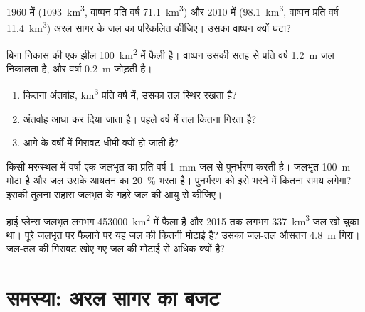 \begin{exercise}[$\star\star\star$]\label{exo:g10:freshwater-resources:12}
1960 में (\qty{1093}{km^3}, वाष्पन प्रति वर्ष \qty{71.1}{km^3}) और 2010 में
(\qty{98.1}{km^3}, वाष्पन प्रति वर्ष \qty{11.4}{km^3}) अरल सागर के जल का 
परिकलित कीजिए। उसका
वाष्पन क्यों घटा?
\end{exercise}

\begin{exercise}[$\star\star\star$]\label{exo:g10:freshwater-resources:13}
बिना निकास की एक झील \qty{100}{km^2} में फैली है। वाष्पन उसकी सतह से प्रति वर्ष
\qty{1.2}{m} जल निकालता है, और वर्षा \qty{0.2}{m} जोड़ती है।
\begin{enumerate}
  \item कितना अंतर्वाह, \unit{km^3} प्रति वर्ष में, उसका तल स्थिर रखता है?
  \item अंतर्वाह आधा कर दिया जाता है। पहले वर्ष में तल कितना
        गिरता है?
  \item आगे के वर्षों में गिरावट धीमी क्यों हो जाती है?
\end{enumerate}
\end{exercise}

\begin{exercise}[$\star\star\star$]\label{exo:g10:freshwater-resources:14}
किसी मरुस्थल में वर्षा एक जलभृत का प्रति वर्ष \qty{1}{mm} जल से पुनर्भरण करती है।
जलभृत \qty{100}{m} मोटा है और जल उसके आयतन का \qty{20}{\percent} भरता
है। पुनर्भरण को इसे भरने में कितना समय लगेगा? इसकी तुलना
सहारा जलभृत के गहरे जल की आयु से कीजिए।
\end{exercise}

\begin{exercise}[$\star\star\star$]\label{exo:g10:freshwater-resources:15}
हाई प्लेन्स जलभृत लगभग \qty{453000}{km^2} में फैला है और 2015 तक लगभग
\qty{337}{km^3} जल खो चुका था। पूरे जलभृत पर फैलाने पर यह जल की कितनी
मोटाई है? उसका जल-तल औसतन \qty{4.8}{m} गिरा।
जल-तल की गिरावट खोए गए जल की मोटाई से अधिक क्यों है?
\end{exercise}

\section{समस्या: अरल सागर का बजट}

